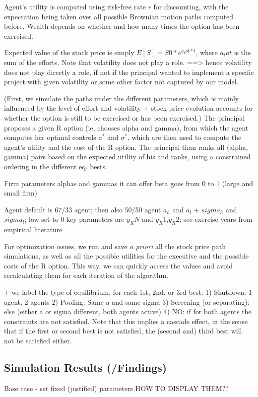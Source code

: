 Agent's utility is computed using risk-free rate $r$ for discounting, with the expectation being taken over all possible Brownian motion paths computed before. Wealth depends on whether and how many times the option has been exercised.

Expected value of the stock price is simply $E[S] = S0 * e^{a_tot * t}$, where $a_tot$ is the sum of the efforts. Note that volatility does not play a role. ==> hence volatility does not play directly a role, if not if the principal wanted to implement a specific project with given volatility or some other factor not captured by our model.

(First, we simulate the paths under the different parameters, which is mainly influenced by the level of effort and volatility + stock price evolution accounts for whether the option is still to be exercised or has been exercised.)
The principal proposes a given R option (ie, chooses alpha and gamma), from which the agent computes her optimal controls $a^*$ and $\sigma^*$, which are then used to compute the agent's utility and the cost of the R option. The principal than ranks all (alpha, gamma) pairs based on the expected utility of his and ranks, using a constrained ordering in the different eq. bests.

Firm parameters
    alphas and gammas it can offer
    beta goes from 0 to 1 (large and small firm)

Agent
    default is 67/33 agent; then also 50/50 agent
    $a_h$ and $a_l$ + $sigma_h$ and $sigma_l$; low set to 0
    key parameters are $y_RN$ and $y_R1$,$y_R2$; see exercise years from empirical literature



For optimization issues, we run and save \textit{a priori} all the stock price path simulations, as well as all the possible utilities for the executive and the possible costs of the R option. This way, we can quickly access the values and avoid recalculating them for each iteration of the algorithm.


+ we label the type of equilibrium, for each 1st, 2nd, or 3rd best:
1) Shutdown: 1 agent, 2 agents
2) Pooling: Same a and same sigma
3) Screening (or separating): else (either a or sigma different, both agents active)
4) NO: if for both agents the constraints are not satisfied. Note that this implies a cascade effect, in the sense that if the first or second best is not satisfied, the (second and) third best will not be satisfied either. 


\subsection*{Simulation Results (/Findings)} 
Base case - set fixed (justified) parameters
HOW TO DISPLAY THEM??


